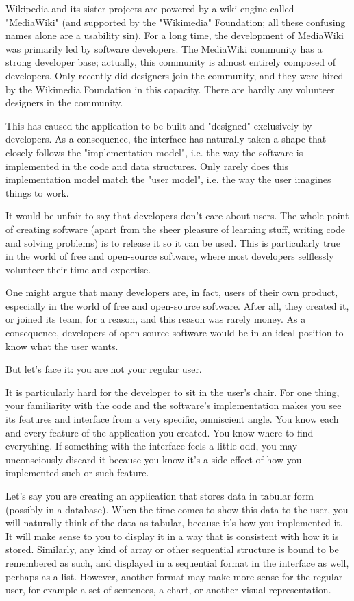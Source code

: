 Wikipedia and its sister projects are powered by a wiki engine called "MediaWiki" (and supported by the "Wikimedia" Foundation; all these confusing names alone are a usability sin). For a long time, the development of MediaWiki was primarily led by software developers. The MediaWiki community has a strong developer base; actually, this community is almost entirely composed of developers. Only recently did designers join the community, and they were hired by the Wikimedia Foundation in this capacity. There are hardly any volunteer designers in the community.

This has caused the application to be built and "designed" exclusively by developers. As a consequence, the interface has naturally taken a shape that closely follows the "implementation model", i.e. the way the software is implemented in the code and data structures. Only rarely does this implementation model match the "user model", i.e. the way the user imagines things to work.

It would be unfair to say that developers don't care about users. The whole point of creating software (apart from the sheer pleasure of learning stuff, writing code and solving problems) is to release it so it can be used. This is particularly true in the world of free and open-source software, where most developers selflessly volunteer their time and expertise.

One might argue that many developers are, in fact, users of their own product, especially in the world of free and open-source software. After all, they created it, or joined its team, for a reason, and this reason was rarely money. As a consequence, developers of open-source software would be in an ideal position to know what the user wants.

But let's face it: you are not your regular user.

It is particularly hard for the developer to sit in the user's chair. For one thing, your familiarity with the code and the software's implementation makes you see its features and interface from a very specific, omniscient angle. You know each and every feature of the application you created. You know where to find everything. If something with the interface feels a little odd, you may unconsciously discard it because you know it's a side-effect of how you implemented such or such feature.

Let's say you are creating an application that stores data in tabular form (possibly in a database). When the time comes to show this data to the user, you will naturally think of the data as tabular, because it's how you implemented it. It will make sense to you to display it in a way that is consistent with how it is stored. Similarly, any kind of array or other sequential structure is bound to be remembered as such, and displayed in a sequential format in the interface as well, perhaps as a list. However, another format may make more sense for the regular user, for example a set of sentences, a chart, or another visual representation.

